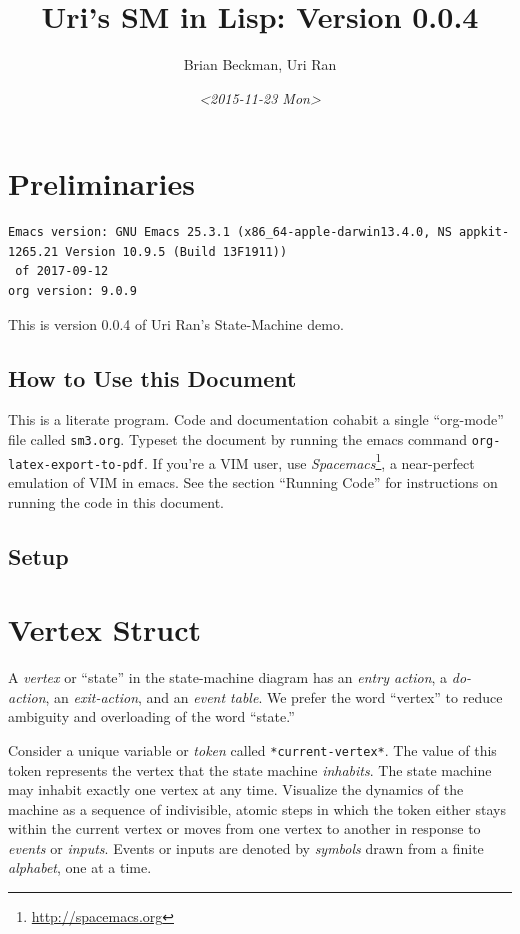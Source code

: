 \documentclass[10pt,oneside,x11names]{article}
\author{Brian Beckman, Uri Ran}
\date{\textit{<2015-11-23 Mon>}}
\title{Uri's SM in Lisp: Version 0.0.4}
\begin{document}
\maketitle
\setcounter{tocdepth}{2}
\tableofcontents


\section{Preliminaries}
\label{sec:org864d3e0}

\begin{verbatim}
Emacs version: GNU Emacs 25.3.1 (x86_64-apple-darwin13.4.0, NS appkit-1265.21 Version 10.9.5 (Build 13F1911))
 of 2017-09-12
org version: 9.0.9
\end{verbatim}

This is version 0.0.4 of Uri Ran's State-Machine demo.

\subsection{How to Use this Document}
\label{sec:org546c49d}

This is a literate program. Code and documentation cohabit a single
``org-mode'' file called \texttt{sm3.org}. Typeset the document by running the emacs
command \texttt{org-latex-export-to-pdf}. If you're a VIM user, use
\emph{Spacemacs}\footnote{\url{http://spacemacs.org}}, a near-perfect emulation of VIM in emacs. See the
section ``Running Code'' for instructions on running the code in this document.

\subsection{Setup}
\label{sec:org58a2284}

\section{Vertex Struct}
\label{sec:org9c9f410}

A \emph{vertex} or ``state'' in the state-machine diagram has an \emph{entry action}, a
\emph{do-action}, an \emph{exit-action}, and an \emph{event table}.  We prefer the word
``vertex'' to reduce ambiguity and overloading of the word ``state.''

Consider a unique variable or \emph{token} called \texttt{*current-vertex*}. The value of
this token represents the vertex that the state machine \emph{inhabits}. The state
machine may inhabit exactly one vertex at any time. Visualize the dynamics of
the machine as a sequence of indivisible, atomic steps in which the token
either stays within the current vertex or moves from one vertex to another in
response to \emph{events} or \emph{inputs}. Events or inputs are denoted by \emph{symbols}
drawn from a finite \emph{alphabet}, one at a time.
\end{document}
